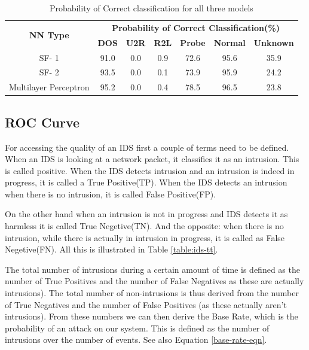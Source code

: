 \documentclass[12pt]{article}
\theoremstyle{definition}
\begin{document}
		\begin{table}[!h]
			\centering
			\caption{Probability of Correct classification for all three models }
			\label{tab:pcc-results}
			\begin{tabular}{|c|c|c|c|c|c|c|}
				\hline
				\multirow{2}{*}{\textbf{NN Type}} & \multicolumn{6}{c|}{\textbf{Probability of Correct Classification(\%)}}                          \\ \cline{2-7} 
				& \textbf{DOS} & \textbf{U2R} & \textbf{R2L} & \textbf{Probe} & \textbf{Normal} & \textbf{Unknown} \\ \hline
				SF- 1                             & 91.0         & 0.0          & 0.9          & 72.6           & 95.6            & 35.9        \\     
				SF- 2                              & 93.5         & 0.0          & 0.1          & 73.9           & 95.9            & 24.2      \\       
				Multilayer Perceptron             & 95.2         & 0.0          & 0.4          & 78.5           & 96.5            & 23.8    \\    \hline     
			\end{tabular}
		\end{table}
		
		\subsection{ROC Curve}
		For accessing the quality of an IDS first a couple of terms need to be defined. When an IDS is looking at a network packet, it classifies it as an intrusion. This is called positive. When the IDS detects intrusion and an intrusion is indeed in progress, it is called a True Positive(TP). When the IDS detects an intrusion when there is no intrusion, it is called False Positive(FP).
		
		On the other hand when an intrusion is not in progress and IDS detects it as harmless it is called True Negetive(TN). And the opposite: when there is no intrusion, while there is actually in intrusion in progress, it is called as False Negetive(FN). All this is illustrated in Table \ref{table:ids-tt}.
		
		The total number of intrusions during a certain amount of time is defined as the number of True Positives and the number of False Negatives as these are actually intrusions). The total number of non-intrusions is thus derived from the number of True Negatives and the number of False Positives (as these actually aren’t intrusions). From these numbers we can then derive the Base Rate, which is the probability of an attack on our
		system. This is defined as the number of intrusions over the number of events. See also Equation \ref{base-rate-eqn}.
		
\end{document}
